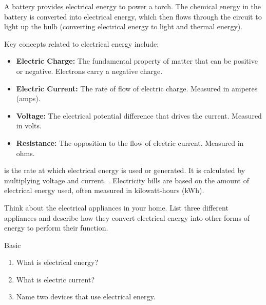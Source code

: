 \begin{example}
A battery provides electrical energy to power a torch. The chemical energy in the battery is converted into electrical energy, which then flows through the circuit to light up the bulb (converting electrical energy to light and thermal energy).
\end{example}

Key concepts related to electrical energy include:

\begin{itemize}
    \item \textbf{Electric Charge:}  The fundamental property of matter that can be positive or negative.  Electrons carry a negative charge.
    \item \textbf{Electric Current:} The rate of flow of electric charge. Measured in amperes (amps).
    \item \textbf{Voltage:} The electrical potential difference that drives the current. Measured in volts.
    \item \textbf{Resistance:}  The opposition to the flow of electric current. Measured in ohms.
\end{itemize}

\begin{marginnote}
 is the rate at which electrical energy is used or generated.  It is calculated by multiplying voltage and current. .  Electricity bills are based on the amount of electrical energy used, often measured in kilowatt-hours (kWh).
\end{marginnote}

\begin{stopandthink}
Think about the electrical appliances in your home.  List three different appliances and describe how they convert electrical energy into other forms of energy to perform their function.
\end{stopandthink}


\begin{tieredquestions}{Basic}
\begin{enumerate}
    \item What is electrical energy?
    \item What is electric current?
    \item Name two devices that use electrical energy.
\end{enumerate}
\end{tieredquestions}

